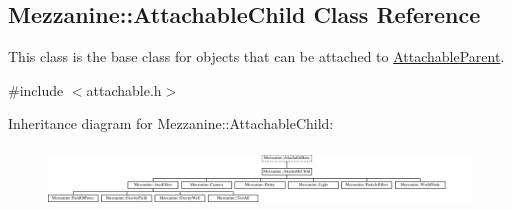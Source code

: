 \hypertarget{classMezzanine_1_1AttachableChild}{
\subsection{Mezzanine::AttachableChild Class Reference}
\label{classMezzanine_1_1AttachableChild}
}


This class is the base class for objects that can be attached to \hyperlink{classMezzanine_1_1AttachableParent}{AttachableParent}.  




{\ttfamily \#include $<$attachable.h$>$}

Inheritance diagram for Mezzanine::AttachableChild:\begin{figure}[H]
\begin{center}
\leavevmode
\includegraphics[height=1.590909cm]{classMezzanine_1_1AttachableChild}
\end{center}
\end{figure}
